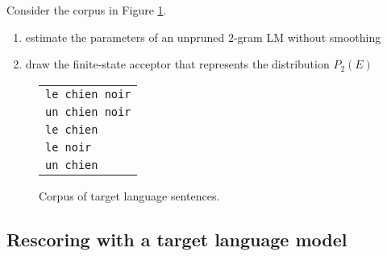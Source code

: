 Consider the corpus in Figure \ref{fig:corpus}.
\begin{enumerate}
	\item estimate the parameters of an unpruned $2$-gram LM without smoothing
	\item draw the finite-state acceptor that represents the distribution $P_2(E)$
\end{enumerate}

\begin{figure}[h]\centering
\begin{tabular}{l}
\texttt{le chien noir}\\
\texttt{un chien noir}\\
\texttt{le chien}\\
\texttt{le noir}\\
\texttt{un chien}\\
\end{tabular}
\caption{\label{fig:corpus}Corpus of target language sentences.}
\end{figure}



\subsection{Rescoring with a target language model}

